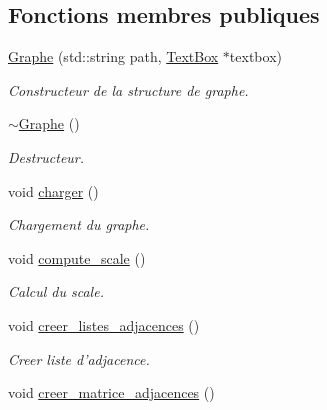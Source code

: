 \subsection*{Fonctions membres publiques}
\begin{DoxyCompactItemize}
\item 
\hyperlink{classGraphe_a1e06a49b72dc9a32ea91da7ec9610b0b}{Graphe} (std\+::string path, \hyperlink{classTextBox}{Text\+Box} $\ast$textbox)
\begin{DoxyCompactList}\small\item\em Constructeur de la structure de graphe. \end{DoxyCompactList}\item 
\hypertarget{classGraphe_a673c897db564767e9ace7169a5357310}{\hyperlink{classGraphe_a673c897db564767e9ace7169a5357310}{$\sim$\+Graphe} ()}\label{classGraphe_a673c897db564767e9ace7169a5357310}

\begin{DoxyCompactList}\small\item\em Destructeur. \end{DoxyCompactList}\item 
void \hyperlink{classGraphe_a983bd623b721d7485805d252008d82f4}{charger} ()
\begin{DoxyCompactList}\small\item\em Chargement du graphe. \end{DoxyCompactList}\item 
void \hyperlink{classGraphe_a05cda8c7b64b92b3b283dbd774e9ac44}{compute\+\_\+scale} ()
\begin{DoxyCompactList}\small\item\em Calcul du scale. \end{DoxyCompactList}\item 
\hypertarget{classGraphe_ae6dabb6a2315a88f7e0b35956d59a46b}{void \hyperlink{classGraphe_ae6dabb6a2315a88f7e0b35956d59a46b}{creer\+\_\+listes\+\_\+adjacences} ()}\label{classGraphe_ae6dabb6a2315a88f7e0b35956d59a46b}

\begin{DoxyCompactList}\small\item\em Creer liste d'adjacence. \end{DoxyCompactList}\item 
\hypertarget{classGraphe_ad6bf6139a94a026f4288e5ba1eb53e08}{void \hyperlink{classGraphe_ad6bf6139a94a026f4288e5ba1eb53e08}{creer\+\_\+matrice\+\_\+adjacences} ()}\label{classGraphe_ad6bf6139a94a026f4288e5ba1eb53e08}


\end{DoxyCompactItemize}
